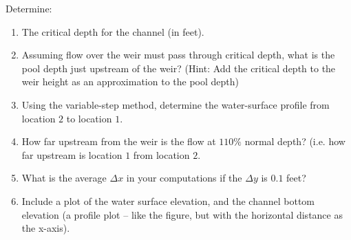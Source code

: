 \documentclass[12pt]{article}
\begin{document}
\begin{enumerate}
Determine: 
\begin{enumerate}[i]
\item The critical depth for the channel (in feet).
\item Assuming flow over the weir must pass through critical depth, what is the pool depth just upstream of the weir? (Hint: Add the critical depth to the weir height as an approximation to the pool depth)
\item Using the variable-step method, determine the water-surface profile from location $2$ to location $1$.
\item How far upstream from the weir is the flow at $110\%$ normal depth? (i.e. how far upstream is location $1$ from location $2$.
\item What is the average $\Delta x$ in your computations if the $\Delta y$ is $0.1$ feet?
\item Include a plot of the water surface elevation, and the channel bottom elevation (a profile plot -- like the figure, but with the horizontal distance as the x-axis).
\end{enumerate}
%
%
%

\end{enumerate}
\end{document}
